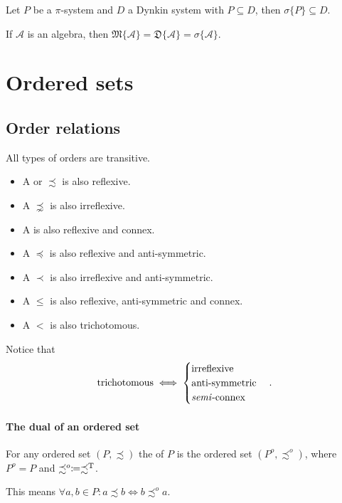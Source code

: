 \begin{corollary} \label{corollary:piLambdaTheorem}
Let $P$ be a $\pi$-system and $D$ a Dynkin system with $P\subseteq D$, then $\sigma\{P\} \subseteq D$.
\end{corollary}
\begin{corollary}
If $\mathcal{A}$ is an algebra, then $\mathfrak{M}\{\mathcal{A}\} = \mathfrak{D}\{\mathcal{A}\} = \sigma\{\mathcal{A}\}$.
\end{corollary}

\chapter{Ordered sets}
\section{Order relations}
\begin{definition}
All types of orders are transitive.
\begin{itemize}
\item A  or  $\precsim$ is also reflexive.
\item A  $\precnsim$ is also irreflexive.
\item A  is also reflexive and connex.
\item A  $\preceq$ is also reflexive and anti-symmetric.
\item A  $\prec$ is also irreflexive and anti-symmetric.
\item A  $\leq$ is also reflexive, anti-symmetric and connex.
\item A  $<$ is also trichotomous.
\end{itemize}
\end{definition}
Notice that
\[ \text{trichotomous} \iff \begin{cases}
\text{irreflexive} \\ \text{anti-symmetric} \\ \text{\textit{semi}-connex}
\end{cases}. \]

\subsubsection{The dual of an ordered set}
\begin{definition}
For any ordered set $(P, \precsim)$ the  of $P$ is the ordered set $(P^o, \precsim^o)$, where $P^o=P$ and $\precsim^o \coloneqq \precsim^{\mathrm{T}}$.
\end{definition}
This means $\forall a,b\in P: a\precsim b \iff b\precsim^o a$.

